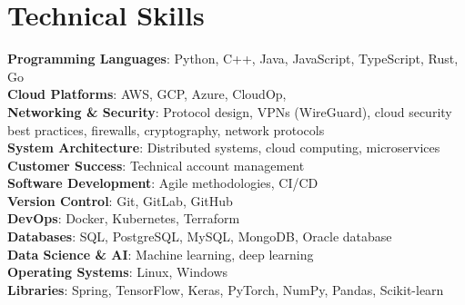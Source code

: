 \documentclass[letterpaper,11pt]{article}
\begin{document}
\section{Technical Skills}
 \begin{itemize}[leftmargin=0.15in, label={}]
    \small{\item{
     \textbf{Programming Languages}{: Python, C++, Java, JavaScript, TypeScript, Rust, Go} \\
    
     \textbf{Cloud Platforms}{: AWS, GCP, Azure, CloudOp,} \\
    
     \textbf{Networking \& Security}{: Protocol design, VPNs (WireGuard), cloud security best practices, firewalls, cryptography, network protocols} \\
     
     \textbf{System Architecture}{: Distributed systems,  cloud computing, microservices} \\

     \textbf{Customer Success}{: Technical account management} \\
     
     \textbf{Software Development}{: Agile methodologies, CI/CD} \\

     \textbf{Version Control}{: Git, GitLab, GitHub} \\

     \textbf{DevOps}{: Docker, Kubernetes, Terraform} \\

      \textbf{Databases}{: SQL, PostgreSQL, MySQL, MongoDB, Oracle database} \\

     \textbf{Data Science \& AI}{: Machine learning, deep learning} \\

      \textbf{Operating Systems}{: Linux, Windows} \\

     \textbf{Libraries}{: Spring, TensorFlow, Keras, PyTorch, NumPy, Pandas, Scikit-learn} \\
    }}
 \end{itemize}

\end{document}
